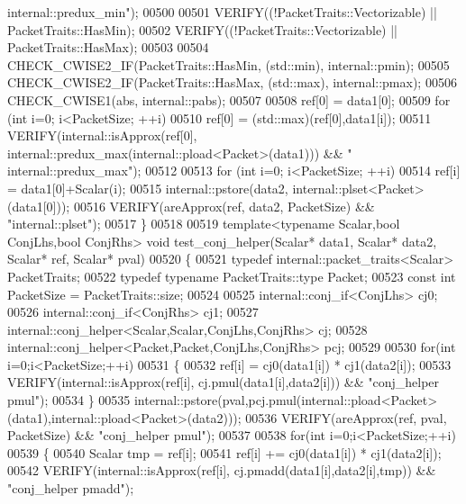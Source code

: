 \begin{DoxyCode}
{      internal::predux\_min"});
00500 
00501   VERIFY((!PacketTraits::Vectorizable) || PacketTraits::HasMin);
00502   VERIFY((!PacketTraits::Vectorizable) || PacketTraits::HasMax);
00503 
00504   CHECK\_CWISE2\_IF(PacketTraits::HasMin, (std::min), internal::pmin);
00505   CHECK\_CWISE2\_IF(PacketTraits::HasMax, (std::max), internal::pmax);
00506   CHECK\_CWISE1(abs, internal::pabs);
00507 
00508   ref[0] = data1[0];
00509   \textcolor{keywordflow}{for} (\textcolor{keywordtype}{int} i=0; i<PacketSize; ++i)
00510     ref[0] = (std::max)(ref[0],data1[i]);
00511   VERIFY(internal::isApprox(ref[0], internal::predux\_max(internal::pload<Packet>(data1))) && \textcolor{stringliteral}{"
      internal::predux\_max"});
00512 
00513   \textcolor{keywordflow}{for} (\textcolor{keywordtype}{int} i=0; i<PacketSize; ++i)
00514     ref[i] = data1[0]+Scalar(i);
00515   internal::pstore(data2, internal::plset<Packet>(data1[0]));
00516   VERIFY(areApprox(ref, data2, PacketSize) && \textcolor{stringliteral}{"internal::plset"});
00517 \}
00518 
00519 \textcolor{keyword}{template}<\textcolor{keyword}{typename} Scalar,\textcolor{keywordtype}{bool} ConjLhs,\textcolor{keywordtype}{bool} ConjRhs> \textcolor{keywordtype}{void} test\_conj\_helper(Scalar* data1, Scalar* data2, 
      Scalar* ref, Scalar* pval)
00520 \{
00521   \textcolor{keyword}{typedef} internal::packet\_traits<Scalar> PacketTraits;
00522   \textcolor{keyword}{typedef} \textcolor{keyword}{typename} PacketTraits::type Packet;
00523   \textcolor{keyword}{const} \textcolor{keywordtype}{int} PacketSize = PacketTraits::size;
00524 
00525   internal::conj\_if<ConjLhs> cj0;
00526   internal::conj\_if<ConjRhs> cj1;
00527   internal::conj\_helper<Scalar,Scalar,ConjLhs,ConjRhs> cj;
00528   internal::conj\_helper<Packet,Packet,ConjLhs,ConjRhs> pcj;
00529 
00530   \textcolor{keywordflow}{for}(\textcolor{keywordtype}{int} i=0;i<PacketSize;++i)
00531   \{
00532     ref[i] = cj0(data1[i]) * cj1(data2[i]);
00533     VERIFY(internal::isApprox(ref[i], cj.pmul(data1[i],data2[i])) && \textcolor{stringliteral}{"conj\_helper pmul"});
00534   \}
00535   internal::pstore(pval,pcj.pmul(internal::pload<Packet>(data1),internal::pload<Packet>(data2)));
00536   VERIFY(areApprox(ref, pval, PacketSize) && \textcolor{stringliteral}{"conj\_helper pmul"});
00537 
00538   \textcolor{keywordflow}{for}(\textcolor{keywordtype}{int} i=0;i<PacketSize;++i)
00539   \{
00540     Scalar tmp = ref[i];
00541     ref[i] += cj0(data1[i]) * cj1(data2[i]);
00542     VERIFY(internal::isApprox(ref[i], cj.pmadd(data1[i],data2[i],tmp)) && \textcolor{stringliteral}{"conj\_helper pmadd"});

\end{DoxyCode}
